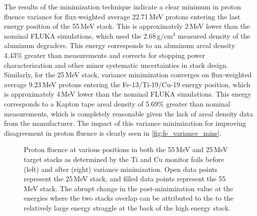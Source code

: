 The results of the minimization technique indicate a clear minimum in proton fluence variance for flux-weighted average 22.71\,MeV protons entering the last energy position of the 55\,MeV stack.
This is approximately 2\,MeV lower than the 
nominal 
FLUKA simulations,
which used the 
2.68\,g/cm$^3$ measured density of the  aluminum degraders.
This energy corresponds to an aluminum areal density  4.43\% greater than 
measurements and 
corrects for stopping power characterization and other minor systematic uncertainties in stack design.
Similarly, for the 25\,MeV stack, variance minimization converges on  flux-weighted average 9.23\,MeV protons entering the Fe-13/Ti-19/Cu-19 energy position, which is approximately 4\,MeV lower than the nominal FLUKA simulations.
This energy corresponds to a Kapton tape areal density of 5.69\% greater than nominal measurements, which is completely reasonable given the lack of areal density data from the manufacturer.
The impact of this variance minimization for improving disagreement in proton fluence is  clearly  seen in   \autoref{fig:fe_variance_mins}.




\begin{figure}
    \centering
    \caption{Proton fluence at various positions in both the 55\,MeV and 25\,MeV target stacks as determined by the Ti and Cu monitor foils before (left) and after (right) variance minimization. Open data points represent the 25\,MeV stack, and filled data points represent the 55\,MeV stack. The abrupt change in the post-minimization value at the energies where the two stacks overlap can be attributed to the to the relatively large energy straggle at the back of the high energy stack.}  
     \label{fig:fe_variance_mins}
\end{figure}





